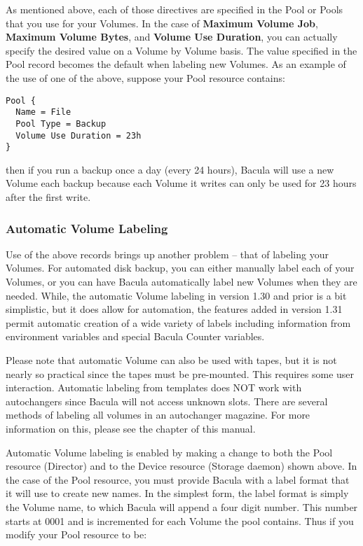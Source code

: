 As mentioned above, each of those directives are specified in the Pool or
Pools that you use for your Volumes. In the case of {\bf Maximum Volume Job},
{\bf Maximum Volume Bytes}, and {\bf Volume Use Duration}, you can actually
specify the desired value on a Volume by Volume basis. The value specified in
the Pool record becomes the default when labeling new Volumes. As an example
of the use of one of the above, suppose your Pool resource contains: 

\footnotesize
\begin{verbatim}
Pool {
  Name = File
  Pool Type = Backup
  Volume Use Duration = 23h
}
\end{verbatim}
\normalsize

then if you run a backup once a day (every 24 hours), Bacula will use a new
Volume each backup because each Volume it writes can only be used for 23 hours
after the first write. 
\label{AutomaticLabeling}

\subsubsection*{Automatic Volume Labeling}

Use of the above records brings up another problem -- that of labeling your
Volumes. For automated disk backup, you can either manually label each of your
Volumes, or you can have Bacula automatically label new Volumes when they are
needed. While, the automatic Volume labeling in version 1.30 and prior is a
bit simplistic, but it does allow for automation, the features added in
version 1.31 permit automatic creation of a wide variety of labels including
information from environment variables and special Bacula Counter variables. 

Please note that automatic Volume can also be used with tapes, but it is not
nearly so practical since the tapes must be pre-mounted. This requires some
user interaction. Automatic labeling from templates does NOT work with
autochangers since Bacula will not access unknown slots. There are several
methods of labeling all volumes in an autochanger magazine. For more
information on this, please see the 
 chapter of this manual. 

Automatic Volume labeling is enabled by making a change to both the Pool
resource (Director) and to the Device resource (Storage daemon) shown above.
In the case of the Pool resource, you must provide Bacula with a label format
that it will use to create new names. In the simplest form, the label format
is simply the Volume name, to which Bacula will append a four digit number.
This number starts at 0001 and is incremented for each Volume the pool
contains. Thus if you modify your Pool resource to be: 

